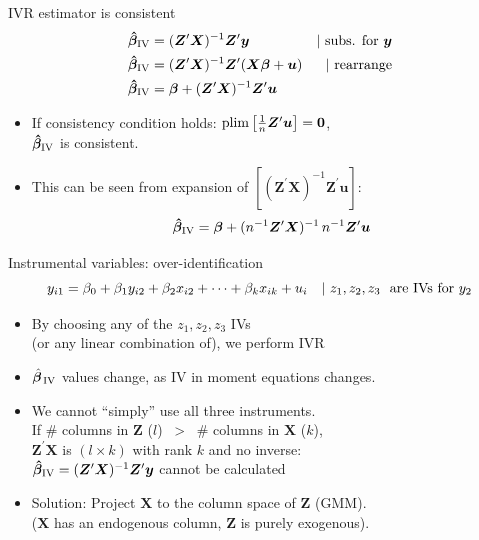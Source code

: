 \documentclass[usenames,dvipsnames]{beamer}
\begin{document}
\begin{frame}{IVR estimator is consistent}
\begin{align*}
    \bm{\hat{\beta}}_{\textnormal{IV}} &= (\bm{Z}^{\prime}\bm{X})^{-1} \bm{Z}^{\prime}\bm{y} &|~ \textnormal{subs. for~} \bm{y} \\
     \bm{\hat{\beta}}_{\textnormal{IV}} &= (\bm{Z}^{\prime}\bm{X})^{-1} \bm{Z}^{\prime}(\bm{X \beta} + \bm{u}) &|~ \textnormal{rearrange} \\
    \bm{\hat{\beta}}_{\textnormal{IV}} &= \bm{\beta} + (\bm{Z}^{\prime}\bm{X})^{-1} \bm{Z}^{\prime}\bm{u}
    \end{align*}
\begin{itemize}
    \medskip
    \item If consistency condition holds: $\textnormal{plim}\left[\frac{1}{n}\bm{Z}^{\prime}\bm{u}\right]= \bm{0}$, \\$\bm{\hat{\beta}}_{\textnormal{IV}}$ is consistent.
    \medskip
    \item This can be seen from expansion of $[(\bm{Z}^{\prime}\bm{X})^{-1} \bm{Z}^{\prime}\bm{u}] $:
    $$
    \bm{\hat{\beta}}_{\textnormal{IV}} = \bm{\beta} + (n^{-1}\bm{Z}^{\prime}\bm{X})^{-1}\, n^{-1}\bm{Z}^{\prime}\bm{u}
    $$
\end{itemize}
\end{frame}
\begin{frame}{Instrumental variables: over-identification}
\vspace{-0.5cm}
$$y_{i1}=\beta_0 + \beta_1 y_{i2} + \beta_2 x_{i2} + \dots + \beta_k x_{ik} + u_{i} \quad|~z_1, z_2, z_3 \textnormal{~ are IVs for } y_2$$

\begin{itemize}
    \item By choosing any of the $z_1, z_2, z_3$ IVs \\(or any linear combination of), we perform IVR
    \item $\hat{\bm{\beta}}_{\textnormal{\,IV}}$ values change, as IV  in moment equations changes.
    \item We cannot ``simply'' use all three instruments. \\If \# columns in $\bm{Z}$ ($l$) ~>~ \# columns in $\bm{X}$ ($k$),\\
    $\bm{Z}^{\prime}\bm{X}$ is $(l\times k)$ with rank $k$ and no inverse:
    \\$\bm{\hat{\beta}}_{\textnormal{IV}} = (\bm{Z}^{\prime}\bm{X})^{-1} \bm{Z}^{\prime}\bm{y}$ cannot be calculated \\
    \medskip
    \item Solution: Project $\bm{X}$ to the column space of $\bm{Z}$ (GMM).\\
    ($\bm{X}$ has an endogenous column, $\bm{Z}$ is purely exogenous).
\end{itemize}
\end{frame}
\end{document}
